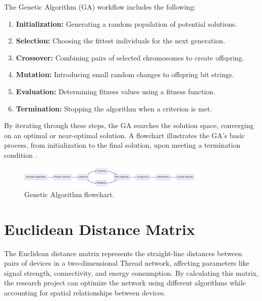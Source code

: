 The Genetic Algorithm (GA) workflow includes the following:

\vspace{2mm}
\begin{enumerate}
    \item \textbf{Initialization:} Generating a random population of potential solutions.
    \item \textbf{Selection:} Choosing the fittest individuals for the next generation.
    \item \textbf{Crossover:} Combining pairs of selected chromosomes to create offspring.
    \item \textbf{Mutation:} Introducing small random changes to offspring bit strings.
    \item \textbf{Evaluation:} Determining fitness values using a fitness function.
    \item \textbf{Termination:} Stopping the algorithm when a criterion is met.
\end{enumerate}
\vspace{3mm}

By iterating through these steps, the GA searches the solution space, converging on an optimal or near-optimal solution. A flowchart illustrates the GA's basic process, from initialization to the final solution, upon meeting a termination condition \cite{lambora2019genetic}.

\begin{figure}[!htb]
    \centering
    \includegraphics[width=0.8\textwidth]{images/situational_theoretical_analysis/genetic_algorithm.png}
    \caption{Genetic Algorithm flowchart.}
    \label{fig:genetic_algorithm}
\end{figure}


\section{Euclidean Distance Matrix}\label{sec:euclidean_distance_matrix}
The Euclidean distance matrix represents the straight-line distances between pairs of devices in a two-dimensional Thread network, affecting parameters like signal strength, connectivity, and energy consumption. By calculating this matrix, the research project can optimize the network using different algorithms while accounting for spatial relationships between devices.

